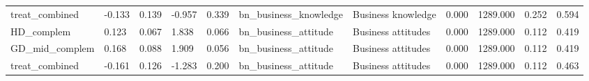 \begin{tabular}{lllllllllll}
treat\_combined & -0.133 & 0.139 & -0.957 & 0.339 & bn\_business\_knowledge & Business knowledge & 0.000 & 1289.000 & 0.252 & 0.594 \\
HD\_complem & 0.123 & 0.067 & 1.838 & 0.066 & bn\_business\_attitude & Business attitudes & 0.000 & 1289.000 & 0.112 & 0.419 \\
GD\_mid\_complem & 0.168 & 0.088 & 1.909 & 0.056 & bn\_business\_attitude & Business attitudes & 0.000 & 1289.000 & 0.112 & 0.419 \\
treat\_combined & -0.161 & 0.126 & -1.283 & 0.200 & bn\_business\_attitude & Business attitudes & 0.000 & 1289.000 & 0.112 & 0.463 \\
\bottomrule
\end{tabular}
